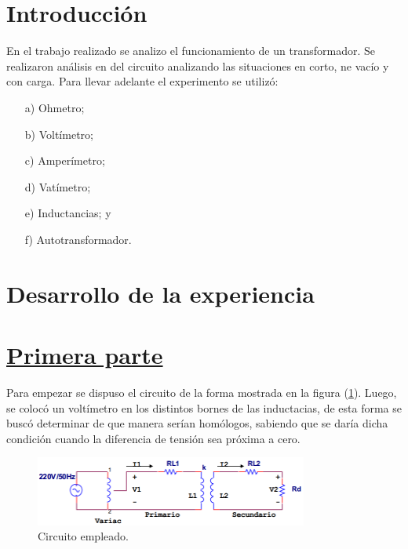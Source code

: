 \documentclass[a4paper]{article}
\begin{document}




\section*{Introducción}

En el trabajo realizado se analizo el funcionamiento de un transformador. Se realizaron análisis en del circuito analizando las situaciones en corto, ne vacío y con carga. Para llevar adelante el experimento se utilizó:
\begin{itemize}
	\item[a)]	Ohmetro;
	\item[b)]	Voltímetro;
	\item[c)]	Amperímetro;
	\item[d)]	Vatímetro;
	\item[e)]	Inductancias; y
	\item[f)]	Autotransformador.
\end{itemize}

\section*{Desarrollo de la experiencia}

\section[I]{\underline{Primera parte}}

Para empezar se dispuso el circuito de la forma mostrada en la figura (\ref{fig:1a}). Luego, se colocó un voltímetro en los distintos bornes de las inductacias, de esta forma se buscó determinar de que manera serían homólogos, sabiendo que se daría dicha condición cuando la diferencia de tensión sea próxima a cero.

\begin{figure}[H]
	\centering
	\includegraphics[width=0.8\textwidth]{Circuito-1.PNG}
	\caption{Circuito empleado.}
	\label{fig:1a}
\end{figure}
\end{document}

